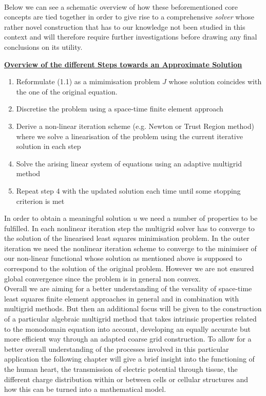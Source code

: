 \documentclass[../draft_1.tex]{subfiles}
\begin{document}
\smallskip
\\ 
Below we can see a schematic overview of how these beforementioned core concepts are tied together in order to give rise to a comprehensive \textit{solver} whose rather novel construction that has to our knowledge not been studied in this context and will therefore require further investigations before drawing any final conclusions on its utility.

\begin{framed}
	\underline{\textbf{Overview of the different Steps towards an Approximate Solution}} 
	
	\begin{enumerate}
		\item  Reformulate (1.1) as a mimimisation problem $J$ whose solution coincides with the one of the original equation. 
		\item Discretise the problem using a space-time finite element approach
		\item Derive a non-linear iteration scheme (e.g. Newton or Trust Region method) where we solve a linearisation of the problem using the current iterative solution in each step
		\item  Solve the arising linear system of equations using an adaptive multigrid method
		\item Repeat step 4 with the updated solution each time until some stopping criterion is met 
	\end{enumerate}	
\end{framed}

In order to obtain a meaningful solution $u$ we need a number of properties to be fulfilled. In each nonlinear iteration step the multigrid solver has to converge to the solution of the linearised least squares minimisation problem. In the outer iteration we need the nonlinear iteration scheme to converge to the minimiser of our non-linear functional whose solution as mentioned above is supposed to correspond to the solution of the original problem. However we are not ensured global convergence since the problem is in general non convex. 
\bigskip
\\
Overall we are aiming for a better understanding of the versality of space-time least squares finite element approaches in general and in combination with multigrid methods. But then an additional focus will be given to the construction of a particular algebraic multigrid method that takes intrinsic properties related to the monodomain equation into account, developing an equally accurate but more efficient way through an adapted coarse grid construction. To allow for a better overall understanding of the processes involved in this particular application the following chapter will give a brief insight into the functioning of the human heart, the transmission of electric potential through tissue, the different charge distribution within or between cells or cellular structures and how this can be turned into a mathematical model. 
\end{document}
